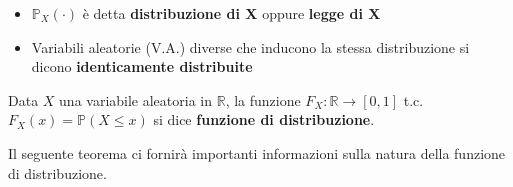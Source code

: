 \vspace{5px}

\begin{itemize}
    \item $\mathbb{P}_X(\cdot)$ è detta \textbf{distribuzione di X} oppure \textbf{legge di X}
    \item Variabili aleatorie (V.A.) diverse che inducono la stessa distribuzione si dicono \textbf{identicamente distribuite}
\end{itemize}

\vspace{10px}

\begin{definition}
    Data $X$ una variabile aleatoria in $\mathbb{R}$, la funzione
    \newline 
    $F_X:\mathbb{R}\longrightarrow[0,1]$ t.c. $F_X(x)=\mathbb{P}(X\leq x)$ si dice \textbf{funzione di distribuzione}.
\end{definition}



Il seguente teorema ci fornirà importanti informazioni sulla natura della funzione di distribuzione.

